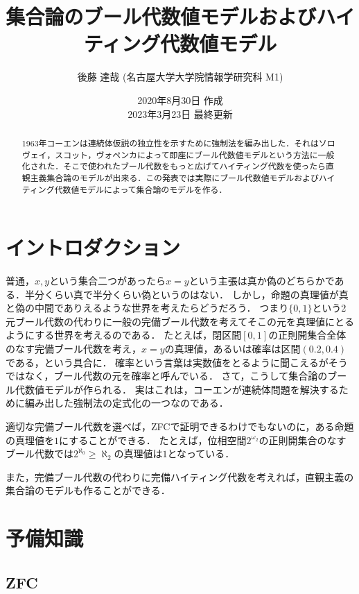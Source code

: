 \documentclass[uplatex,dvipdfmx]{jsarticle}
\title{集合論のブール代数値モデルおよびハイティング代数値モデル}
\date{2020年8月30日 作成 \\ 2023年3月23日 最終更新}
\author{後藤 達哉 (名古屋大学大学院情報学研究科 M1)}
\theoremstyle{definition}
\begin{document}
\maketitle

\begin{abstract}
1963年コーエンは連続体仮説の独立性を示すために強制法を編み出した．それはソロヴェイ，スコット，ヴォペンカによって即座にブール代数値モデルという方法に一般化された．そこで使われたブール代数をもっと広げてハイティング代数を使ったら直観主義集合論のモデルが出来る．この発表では実際にブール代数値モデルおよびハイティング代数値モデルによって集合論のモデルを作る．
\end{abstract} 

\tableofcontents

\section{イントロダクション}

普通，$x, y$という集合二つがあったら$x = y$という主張は真か偽のどちらかである．半分くらい真で半分くらい偽というのはない．
しかし，命題の真理値が真と偽の中間でありえるような世界を考えたらどうだろう．
つまり$\{0, 1\}$という2元ブール代数の代わりに一般の完備ブール代数を考えてそこの元を真理値にとるようにする世界を考えるのである．
たとえば，閉区間$[0, 1]$の正則開集合全体のなす完備ブール代数を考え，$x = y$の真理値，あるいは確率は区間$(0.2, 0.4)$である，という具合に．
確率という言葉は実数値をとるように聞こえるがそうではなく，ブール代数の元を確率と呼んでいる．
さて，こうして集合論のブール代数値モデルが作られる．
実はこれは，コーエンが連続体問題を解決するために編み出した強制法の定式化の一つなのである．

適切な完備ブール代数を選べば，ZFCで証明できるわけでもないのに，ある命題の真理値を$1$にすることができる．
たとえば，位相空間$2^{\omega_2}$の正則開集合のなすブール代数では$2^{\aleph_0} \ge \aleph_2$の真理値は$1$となっている．

また，完備ブール代数の代わりに完備ハイティング代数を考えれば，直観主義の集合論のモデルも作ることができる．

\section{予備知識}

\subsection{ZFC}
\end{document}
